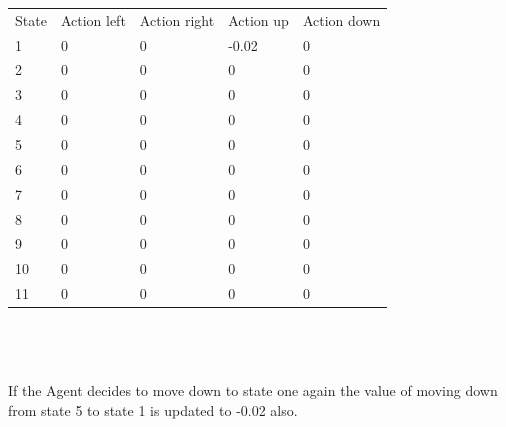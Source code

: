 \begin{tabular}{lllll}
State & Action left & Action right & Action up & Action down \\
1     & 0           & 0            & -0.02     & 0           \\
2     & 0           & 0            & 0         & 0           \\
3     & 0           & 0            & 0         & 0           \\
4     & 0           & 0            & 0         & 0           \\
5     & 0           & 0            & 0         & 0           \\
6     & 0           & 0            & 0         & 0           \\
7     & 0           & 0            & 0         & 0           \\
8     & 0           & 0            & 0         & 0           \\
9     & 0           & 0            & 0         & 0           \\
10    & 0           & 0            & 0         & 0           \\
11    & 0           & 0            & 0         & 0          
\end{tabular}
\\
\\
\\
If the Agent decides to move down to state one again the value of moving down from state 5 to state 1 is updated to -0.02 also.
\\

